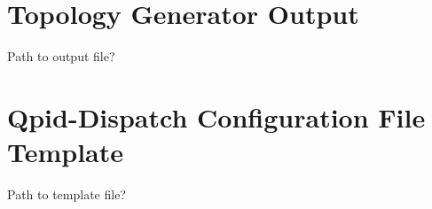 \section{Topology Generator Output}
\label{AP:Topology Generator Output}
Path to output file?

\section{Qpid-Dispatch Configuration File Template}
\label{AP:Qpid-Dispatch Configuration File Template}
Path to template file?


